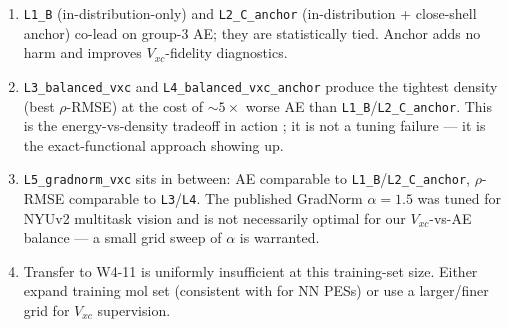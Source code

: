 \documentclass[11pt,letterpaper]{article}
\begin{document}
\begin{enumerate}
\item \texttt{L1\_B} (in-distribution-only) and \texttt{L2\_C\_anchor}
  (in-distribution + close-shell anchor) co-lead on group-3 AE; they are
  statistically tied. Anchor adds no harm and improves $V_{xc}$-fidelity
  diagnostics.
\item \texttt{L3\_balanced\_vxc} and \texttt{L4\_balanced\_vxc\_anchor}
  produce the tightest density (best $\rho$-RMSE) at the cost of $\sim 5\times$
  worse AE than \texttt{L1\_B}/\texttt{L2\_C\_anchor}. This is the
  energy-vs-density tradeoff in action \citep[paraphrased in][]{Kepp2017,Burke1998};
  it is not a tuning failure --- it is the exact-functional approach showing up.
\item \texttt{L5\_gradnorm\_vxc} \citep{ChenGradNorm2018} sits in between:
  AE comparable to \texttt{L1\_B}/\texttt{L2\_C\_anchor}, $\rho$-RMSE
  comparable to \texttt{L3}/\texttt{L4}. The published GradNorm
  $\alpha\!=\!1.5$ was tuned for NYUv2 multitask vision and is not necessarily
  optimal for our $V_{xc}$-vs-AE balance --- a small grid sweep of $\alpha$
  is warranted.
\item Transfer to W4-11 \citep{KartonDaonMartin2011} is uniformly
  insufficient at this training-set size. Either expand training mol set
  (consistent with \citet{BehlerParrinello2007} for NN PESs) or use a
  larger/finer grid for $V_{xc}$ supervision.
\end{enumerate}



\end{document}

